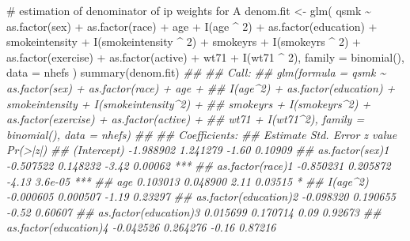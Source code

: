 \documentclass[
  10pt,
  a4paper,
]{book}
\newenvironment{Shaded}{\begin{snugshade}}{\end{snugshade}}
\newcommand{\AttributeTok}[1]{\textcolor[rgb]{0.40,0.45,0.13}{#1}}
\newcommand{\CommentTok}[1]{\textcolor[rgb]{0.37,0.37,0.37}{#1}}
\newcommand{\DecValTok}[1]{\textcolor[rgb]{0.68,0.00,0.00}{#1}}
\newcommand{\DocumentationTok}[1]{\textcolor[rgb]{0.37,0.37,0.37}{\textit{#1}}}
\newcommand{\FunctionTok}[1]{\textcolor[rgb]{0.28,0.35,0.67}{#1}}
\newcommand{\NormalTok}[1]{\textcolor[rgb]{0.00,0.46,0.62}{#1}}
\newcommand{\OtherTok}[1]{\textcolor[rgb]{0.00,0.46,0.62}{#1}}
\newcommand{\SpecialCharTok}[1]{\textcolor[rgb]{0.37,0.37,0.37}{#1}}
\begin{document}
\begin{Shaded}
\begin{Highlighting}[]
\CommentTok{\# estimation of denominator of ip weights for A}
\NormalTok{denom.fit }\OtherTok{\textless{}{-}}
  \FunctionTok{glm}\NormalTok{(}
\NormalTok{    qsmk }\SpecialCharTok{\textasciitilde{}} \FunctionTok{as.factor}\NormalTok{(sex) }\SpecialCharTok{+} \FunctionTok{as.factor}\NormalTok{(race) }\SpecialCharTok{+}\NormalTok{ age }\SpecialCharTok{+} \FunctionTok{I}\NormalTok{(age }\SpecialCharTok{\^{}} \DecValTok{2}\NormalTok{) }\SpecialCharTok{+}
      \FunctionTok{as.factor}\NormalTok{(education) }\SpecialCharTok{+}\NormalTok{ smokeintensity }\SpecialCharTok{+}
      \FunctionTok{I}\NormalTok{(smokeintensity }\SpecialCharTok{\^{}} \DecValTok{2}\NormalTok{) }\SpecialCharTok{+}\NormalTok{ smokeyrs }\SpecialCharTok{+} \FunctionTok{I}\NormalTok{(smokeyrs }\SpecialCharTok{\^{}} \DecValTok{2}\NormalTok{) }\SpecialCharTok{+}
      \FunctionTok{as.factor}\NormalTok{(exercise) }\SpecialCharTok{+} \FunctionTok{as.factor}\NormalTok{(active) }\SpecialCharTok{+}\NormalTok{ wt71 }\SpecialCharTok{+} \FunctionTok{I}\NormalTok{(wt71 }\SpecialCharTok{\^{}} \DecValTok{2}\NormalTok{),}
    \AttributeTok{family =} \FunctionTok{binomial}\NormalTok{(),}
    \AttributeTok{data =}\NormalTok{ nhefs}
\NormalTok{  )}
\FunctionTok{summary}\NormalTok{(denom.fit)}
\DocumentationTok{\#\# }
\DocumentationTok{\#\# Call:}
\DocumentationTok{\#\# glm(formula = qsmk \textasciitilde{} as.factor(sex) + as.factor(race) + age + }
\DocumentationTok{\#\#     I(age\^{}2) + as.factor(education) + smokeintensity + I(smokeintensity\^{}2) + }
\DocumentationTok{\#\#     smokeyrs + I(smokeyrs\^{}2) + as.factor(exercise) + as.factor(active) + }
\DocumentationTok{\#\#     wt71 + I(wt71\^{}2), family = binomial(), data = nhefs)}
\DocumentationTok{\#\# }
\DocumentationTok{\#\# Coefficients:}
\DocumentationTok{\#\#                        Estimate Std. Error z value Pr(\textgreater{}|z|)    }
\DocumentationTok{\#\# (Intercept)           {-}1.988902   1.241279   {-}1.60  0.10909    }
\DocumentationTok{\#\# as.factor(sex)1       {-}0.507522   0.148232   {-}3.42  0.00062 ***}
\DocumentationTok{\#\# as.factor(race)1      {-}0.850231   0.205872   {-}4.13  3.6e{-}05 ***}
\DocumentationTok{\#\# age                    0.103013   0.048900    2.11  0.03515 *  }
\DocumentationTok{\#\# I(age\^{}2)              {-}0.000605   0.000507   {-}1.19  0.23297    }
\DocumentationTok{\#\# as.factor(education)2 {-}0.098320   0.190655   {-}0.52  0.60607    }
\DocumentationTok{\#\# as.factor(education)3  0.015699   0.170714    0.09  0.92673    }
\DocumentationTok{\#\# as.factor(education)4 {-}0.042526   0.264276   {-}0.16  0.87216    }

\end{Highlighting}
\end{Shaded}
\end{document}
